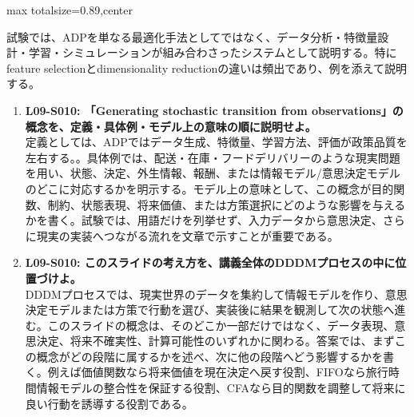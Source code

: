 \begin{minipage}[t]{0.58\textwidth}
\begin{adjustbox}{max totalsize={\textwidth}{0.89\textheight},center}
\begin{minipage}{\textwidth}
試験では、ADPを単なる最適化手法としてではなく、データ分析・特徴量設計・学習・シミュレーションが組み合わさったシステムとして説明する。特にfeature selectionとdimensionality reductionの違いは頻出であり、例を添えて説明する。\par{}\begin{enumerate}\item \textbf{L09-S010: 「Generating stochastic transition from observations」の概念を、定義・具体例・モデル上の意味の順に説明せよ。}\\定義としては、ADPではデータ生成、特徴量、学習方法、評価が政策品質を左右する。。具体例では、配送・在庫・フードデリバリーのような現実問題を用い、状態、決定、外生情報、報酬、または情報モデル/意思決定モデルのどこに対応するかを明示する。モデル上の意味として、この概念が目的関数、制約、状態表現、将来価値、または方策選択にどのような影響を与えるかを書く。試験では、用語だけを列挙せず、入力データから意思決定、さらに現実の実装へつながる流れを文章で示すことが重要である。\item \textbf{L09-S010: このスライドの考え方を、講義全体のDDDMプロセスの中に位置づけよ。}\\DDDMプロセスでは、現実世界のデータを集約して情報モデルを作り、意思決定モデルまたは方策で行動を選び、実装後に結果を観測して次の状態へ進む。このスライドの概念は、そのどこか一部だけではなく、データ表現、意思決定、将来不確実性、計算可能性のいずれかに関わる。答案では、まずこの概念がどの段階に属するかを述べ、次に他の段階へどう影響するかを書く。例えば価値関数なら将来価値を現在決定へ戻す役割、FIFOなら旅行時間情報モデルの整合性を保証する役割、CFAなら目的関数を調整して将来に良い行動を誘導する役割である。\end{enumerate}
\end{minipage}
\end{adjustbox}
\end{minipage}


